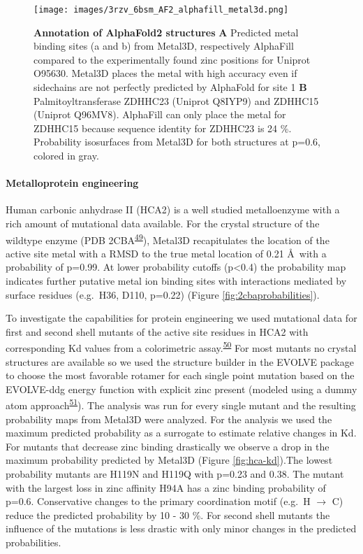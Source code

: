 \documentclass[  ASAPversion,
  ,
  9pt]{elife}
\begin{document}
\begin{figure}
\hypertarget{fig:alphafold}{%
\centering
\texttt{[image: images/3rzv\_6bsm\_AF2\_alphafill\_metal3d.png]}
\caption{\textbf{Annotation of AlphaFold2 structures} \textbf{A} Predicted metal binding sites (a and b) from Metal3D, respectively AlphaFill compared to the experimentally found zinc positions for Uniprot O95630. Metal3D places the metal with high accuracy even if sidechains are not perfectly predicted by AlphaFold for site 1 \textbf{B} Palmitoyltransferase ZDHHC23 (Uniprot Q8IYP9) and ZDHHC15 (Uniprot Q96MV8). AlphaFill can only place the metal for ZDHHC15 because sequence identity for ZDHHC23 is 24 \%. Probability isosurfaces from Metal3D for both structures at p=0.6, colored in gray.}\label{fig:alphafold}
}
\end{figure}

\hypertarget{metalloprotein-engineering}{%
\paragraph{Metalloprotein engineering}\label{metalloprotein-engineering}}

Human carbonic anhydrase II (HCA2) is a well studied metalloenzyme with a rich amount of mutational data available. For the crystal structure of the wildtype enzyme (PDB 2CBA\textsuperscript{\protect\hyperlink{ref-jyFnBdWm}{49}}), Metal3D recapitulates the location of the active site metal with a RMSD to the true metal location of 0.21 \AA\, with a probability of p=0.99. At lower probability cutoffs (p\textless0.4) the probability map indicates further putative metal ion binding sites with interactions mediated by surface residues (e.g.~H36, D110, p=0.22) (Figure \ref{fig:2cbaprobabilities}).

To investigate the capabilities for protein engineering we used mutational data for first and second shell mutants of the active site residues in HCA2 with corresponding Kd values from a colorimetric assay.\textsuperscript{\protect\hyperlink{ref-13XuOF3Jj}{50}} For most mutants no crystal structures are available so we used the structure builder in the EVOLVE package to choose the most favorable rotamer for each single point mutation based on the EVOLVE-ddg energy function with explicit zinc present (modeled using a dummy atom approach\textsuperscript{\protect\hyperlink{ref-pchdLF0k}{51}}). The analysis was run for every single mutant and the resulting probability maps from Metal3D were analyzed. For the analysis we used the maximum predicted probability as a surrogate to estimate relative changes in Kd. For mutants that decrease zinc binding drastically we observe a drop in the maximum probability predicted by Metal3D (Figure \ref{fig:hca-kd}).The lowest probability mutants are H119N and H119Q with p=0.23 and 0.38. The mutant with the largest loss in zinc affinity H94A has a zinc binding probability of p=0.6. Conservative changes to the primary coordination motif (e.g.~H $\rightarrow$ C) reduce the predicted probability by 10 - 30 \%. For second shell mutants the influence of the mutations is less drastic with only minor changes in the predicted probabilities.
\end{document}
